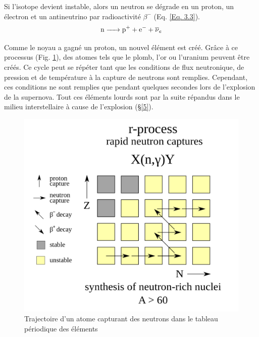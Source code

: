  Si l'isotope devient instable, alors un neutron se dégrade en un proton, un électron et un antineutrino  par radioactivité $\beta^{-}$ (Eq. \ref{Eq. 3.3}).\begin{equation} \ce{n -> \ce{p+} + \ce{e-} + $\overline{\nu}$_{e}}\label{Eq. 3.3} \end{equation}
 
 Comme le noyau a gagné un proton, un nouvel élément est créé. Grâce à ce processus (Fig. \ref{Fig. 3.3}), des atomes tels que le plomb, l'or ou l'uranium peuvent être créés. Ce cycle peut se répéter tant que les conditions de flux neutronique, de pression et de température à la capture de neutrons sont remplies. Cependant, ces conditions ne sont remplies que pendant quelques secondes lors de l'explosion de la supernova. Tout ces éléments lourds sont par la suite répandus dans le milieu interstellaire à cause de l'explosion (§\ref{5}).
 
 \begin{figure}[H]
 	\centering
 	\includegraphics[scale=0.16]{images/processusr}
 	\caption[Trajectoire d'un atome capturant des neutrons dans le tableau périodique des éléments\newline \url{https://it.wikipedia.org/w/index.php?title=Processo_r&oldid=103197986}]{Trajectoire d'un atome capturant des neutrons dans le tableau périodique des éléments}
 	\label{Fig. 3.3}
 \end{figure} 

 \vfill



 
 

